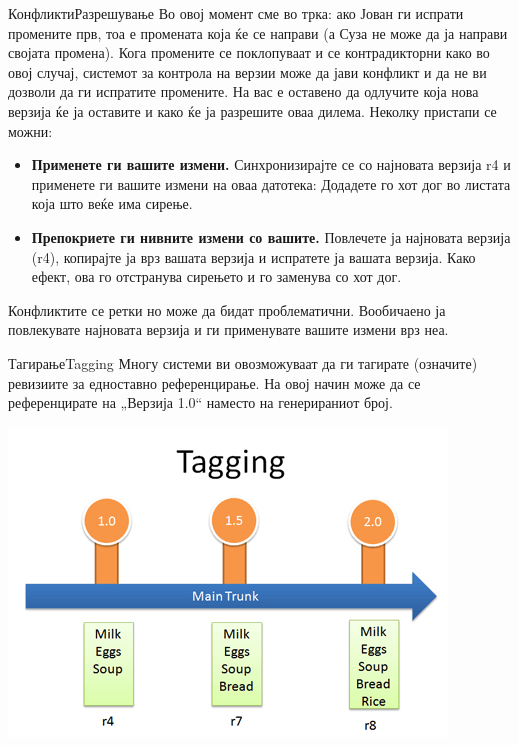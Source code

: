 \begin{frame}[shrink=10]{Конфликти}{Разрешување}
Во овој момент сме во трка: ако Јован ги испрати промените прв, тоа е промената
која ќе се направи (а Суза не може да ја направи својата промена).
\linebreak
Кога промените се поклопуваат и се контрадикторни како во овој случај, системот
за контрола на верзии може да јави конфликт и да не ви дозволи да ги испратите
промените. На вас е оставено да одлучите која нова верзија ќе ја оставите и како
ќе ја разрешите оваа дилема. Неколку пристапи се можни:
\begin{itemize}
  \item \textbf{Применете ги вашите измени.} Синхронизирајте се со најновата верзија r4 и
  применете ги вашите измени на оваа датотека: Додадете го хот дог во листата
  која што веќе има сирење.
  \item \textbf{Препокриете ги нивните измени со вашите.} Повлечете ја најновата
  верзија (r4), копирајте ја врз вашата верзија и испратете ја вашата верзија.
  Како ефект, ова го отстранува сирењето и го заменува со хот дог.
\end{itemize}
Конфликтите се ретки но може да бидат проблематични. Вообичаено ја повлекувате
најновата верзија и ги применувате вашите измени врз неа.
\end{frame}

\begin{frame}{Тагирање}{Tagging}
Многу системи ви овозможуваат да ги тагирате (означите) ревизиите за едноставно
референцирање. На овој начин може да се референцирате на „Верзија 1.0“ наместо
на генерираниот број.
\begin{center}
    \includegraphics[scale=0.4]{images/tagging.png}
\end{center}
\end{frame}


